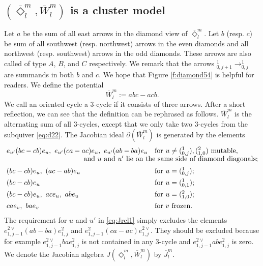 \documentclass{amsart}
\theoremstyle{definition}
\theoremstyle{remark}
\numberwithin{equation}{section}
\newcommand{\br}[1]{\overline{#1}}
\begin{document}
\subsection{$(\br{\Diamond}_l^m,\br{W}_l^m)$ is a cluster model} \label{ss:CM}
Let $a$ be the sum of all east arrows in the diamond view of $\br{\Diamond}_l^m$.
Let $b$ (resp. $c$) be sum of all southwest (resp. northwest) arrows in the even diamonds and all northwest (resp. southwest) arrows in the odd diamonds.
These arrows are also called of type $A$, $B$, and $C$ respectively.
We remark that the arrows $_{0,j+1}^1\to_{0,j}^1$ are summands in both $b$ and $c$. 
We hope that Figure \ref{f:diamond54} is helpful for readers.
We define the potential $$\br{W}_l^m:=abc-acb.$$
We call an oriented cycle a 3-cycle if it consists of three arrows.
After a short reflection, we can see that the definition can be rephrased as follows.
$\br{W}_l^m$ is the alternating sum of all 3-cycles, except that we only take two 3-cycles from the subquiver \eqref{eq:d22}.
The Jacobian ideal $\partial(\br{W}_l^m)$ is generated by the elements
\begin{align}
\label{eq:Jrel1} &e_{u'}(bc-cb)e_u,\ e_{u'}(ca-ac)e_u,\ e_{u'}(ab-ba)e_u && \text{for $u\neq(_{0,j}^{1}),(_{1,0}^{2})$ mutable,}\\[-0.2cm]
\intertext{\hspace{3.7cm} and $u$ and $u'$ lie on the same side of diamond diagonals;} 
\label{eq:Jrel21} &(bc-cb)e_u,\ (ac-ab)e_u && \text{for $u=(_{0,j}^{1})$;}\\
\label{eq:Jrel22} &(bc-cb)e_u && \text{for $u=(_{0,1}^{1})$;}\\
\label{eq:Jrel23} &(bc-cb)e_u,\ ace_u,\ abe_u && \text{for $u=(_{1,0}^{2})$;}\\
\label{eq:Jrel3} &cae_v,\ bae_v && \text{for $v$ frozen.}
\end{align}
The requirement for $u$ and $u'$ in \eqref{eq:Jrel1} simply excludes the elements $e_{1,j-1}^{2\vee}(ab-ba) e_{1,j}^2$ and $e_{1,j-1}^{2} (ca-ac) e_{1,j}^{2\vee}$.
They should be excluded because for example $e_{1,j-1}^{2\vee} ba e_{1,j}^2$ is not contained in any 3-cycle and $e_{1,j-1}^{2\vee} ab e_{1,j}^2$ is zero.
We denote the Jacobian algebra $J(\br{\Diamond}_l^m,\br{W}_l^m)$ by $\br{J}_l^m$.
\end{document}
